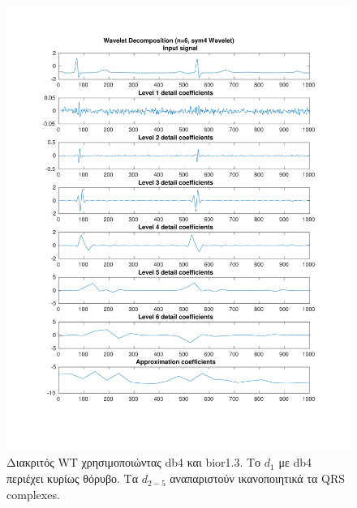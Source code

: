 \documentclass[11pt,a4paper]{article}
\begin{document}
\begin{figure}[H]
\begin{minipage}{0.48\textwidth}
	\includegraphics[width=\textwidth]{fig/123l1_dwt2.pdf}
\end{minipage}
\vfill
\caption{Διακριτός WT χρησιμοποιώντας db4 και bior1.3. Το $d_1$ με db4 περιέχει κυρίως θόρυβο. Τα $d_{2-5}$ αναπαριστούν ικανοποιητικά τα QRS complexes.}
\label{fig:123l1_dwt}
\end{figure}
\end{document}
